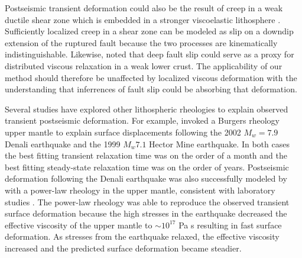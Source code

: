 \documentclass[extra]{gji}
\begin{document}
Postseismic transient deformation could also be the result of creep in
a weak ductile shear zone which is embedded in a stronger viscoelastic
lithosphere \citep[e.g][]{HZ2014}. Sufficiently localized creep in a
shear zone can be modeled as slip on a downdip extension of the
ruptured fault \citep[e.g.][]{H2002,KS2003,JS2004} because the two
processes are kinematically indistinguishable.  Likewise,
\citet{F2006} noted that deep fault slip could serve as a proxy for
distributed viscous relaxation in a weak lower crust. The
applicability of our method should therefore be unaffected by
localized viscous deformation with the understanding that inferrences
of fault slip could be absorbing that deformation.

Several studies have explored other lithospheric rheologies to explain
observed transient postseismic deformation.  For example,
\citet{P2003,P2005} invoked a Burgers rheology upper mantle to explain
surface displacements following the 2002 $M_w=7.9$ Denali earthquake
and the 1999 $M_w7.1$ Hector Mine earthquake.  In both cases the best
fitting transient relaxation time was on the order of a month and the
best fitting steady-state relaxation time was on the order of years.
Postseismic deformation following the Denali earthquake was also
successfully modeled by \citet{F2006b} with a power-law rheology in
the upper mantle, consistent with laboratory studies
\citep[e.g.][]{KK1987}.  The power-law rheology was able to reproduce
the observed transient surface deformation because the high stresses
in the earthquake decreased the effective viscosity of the upper
mantle to $\sim10^{17}$ Pa s resulting in fast surface deformation.  As
stresses from the earthquake relaxed, the effective viscosity
increased and the predicted surface deformation became steadier.
\end{document}
